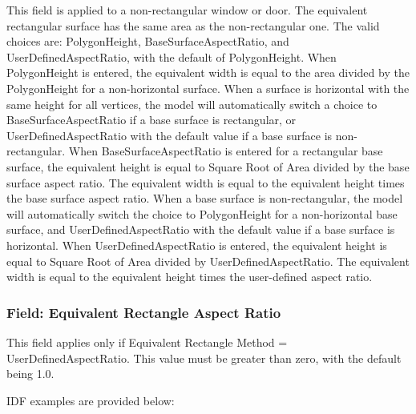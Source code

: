 This field is applied to a non-rectangular window or door. The equivalent
rectangular surface has the same area as the non-rectangular one. The valid
choices are: PolygonHeight, BaseSurfaceAspectRatio, and UserDefinedAspectRatio,
with the default of PolygonHeight. When PolygonHeight is entered, the equivalent
width is equal to the area divided by the PolygonHeight for a non-horizontal
surface. When a surface is horizontal with the same height for all vertices,
the model will automatically switch a choice to BaseSurfaceAspectRatio if a
base surface is rectangular, or UserDefinedAspectRatio with the default value if
a base surface is non-rectangular.  When BaseSurfaceAspectRatio is entered for
a rectangular base surface, the equivalent height is equal to Square Root of
Area divided by the base surface aspect ratio. The equivalent width is equal
to the equivalent height times the base surface aspect ratio. When a base
surface is non-rectangular, the model will automatically switch the choice to
PolygonHeight for a non-horizontal base surface, and UserDefinedAspectRatio
with the default value if a base surface is horizontal. When
UserDefinedAspectRatio is entered, the equivalent height is equal to Square
Root of Area divided by UserDefinedAspectRatio. The equivalent width is equal
to the equivalent height times the user-defined aspect ratio.

 \subsubsection{Field: Equivalent Rectangle Aspect Ratio}\label{equivalent-rectangular-aspect-ratio}

 This field applies only if Equivalent Rectangle Method = UserDefinedAspectRatio. This value must be greater than zero, with the default being 1.0.

IDF examples are provided below:

